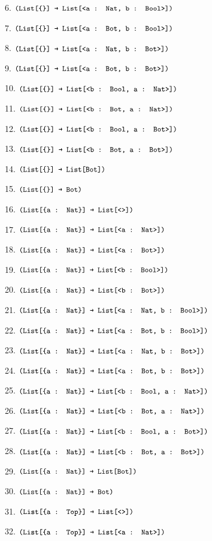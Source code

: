 \documentclass[dvipsnames]{article}
\let\codeOrig\code
\renewcommand{\code}[2][]{%
  \ifmmode
    \if\relax\detokenize{#1}\relax
      \mathchoice{\mbox{\normalfont\small\ttfamily #2}}{\mbox{\normalfont\small\ttfamily #2}}{\mbox{\normalfont\small\ttfamily #2}}{\mbox{\normalfont\small\ttfamily #2}}%
    \else
      \mathchoice{\mbox{\normalfont\small\ttfamily #2}}{\mbox{\normalfont\small\ttfamily #2}}{\mbox{\normalfont\small\ttfamily #2}}{\mbox{\normalfont\small\ttfamily #2}}%
    \fi
  \else
    \codeOrig[#1]{#2}%
  \fi}
\begin{document}
\begin{enumerate}
      6. $\code{(List[\{\}] → List[<a : Nat, b : Bool>])}$

      7. $\code{(List[\{\}] → List[<a : Bot, b : Bool>])}$

      8. $\code{(List[\{\}] → List[<a : Nat, b : Bot>])}$

      9. $\code{(List[\{\}] → List[<a : Bot, b : Bot>])}$

      10. $\code{(List[\{\}] → List[<b : Bool, a : Nat>])}$

      11. $\code{(List[\{\}] → List[<b : Bot, a : Nat>])}$

      12. $\code{(List[\{\}] → List[<b : Bool, a : Bot>])}$

      13. $\code{(List[\{\}] → List[<b : Bot, a : Bot>])}$

      14. $\code{(List[\{\}] → List[Bot])}$

      15. $\code{(List[\{\}] → Bot)}$

      16. $\code{(List[\{a : Nat\}] → List[<>])}$

      17. $\code{(List[\{a : Nat\}] → List[<a : Nat>])}$

      18. $\code{(List[\{a : Nat\}] → List[<a : Bot>])}$

      19. $\code{(List[\{a : Nat\}] → List[<b : Bool>])}$

      20. $\code{(List[\{a : Nat\}] → List[<b : Bot>])}$

      21. $\code{(List[\{a : Nat\}] → List[<a : Nat, b : Bool>])}$

      22. $\code{(List[\{a : Nat\}] → List[<a : Bot, b : Bool>])}$

      23. $\code{(List[\{a : Nat\}] → List[<a : Nat, b : Bot>])}$

      24. $\code{(List[\{a : Nat\}] → List[<a : Bot, b : Bot>])}$

      25. $\code{(List[\{a : Nat\}] → List[<b : Bool, a : Nat>])}$

      26. $\code{(List[\{a : Nat\}] → List[<b : Bot, a : Nat>])}$

      27. $\code{(List[\{a : Nat\}] → List[<b : Bool, a : Bot>])}$

      28. $\code{(List[\{a : Nat\}] → List[<b : Bot, a : Bot>])}$

      29. $\code{(List[\{a : Nat\}] → List[Bot])}$

      30. $\code{(List[\{a : Nat\}] → Bot)}$

      31. $\code{(List[\{a : Top\}] → List[<>])}$

      32. $\code{(List[\{a : Top\}] → List[<a : Nat>])}$


\end{enumerate}
\end{document}
